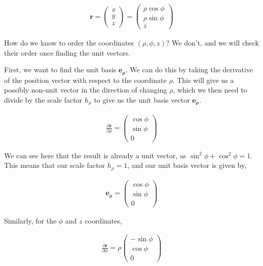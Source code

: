\documentclass[11pt]{amsart}
\begin{document}
\begin{align*}
  \mathbf{r} =
  \begin{pmatrix}
    x \\
    y \\
    z
  \end{pmatrix} =
  \begin{pmatrix}
    \rho\cos\phi \\
    \rho\sin\phi \\
    z
  \end{pmatrix}
\end{align*}

How do we know to order the coordinates $(\rho, \phi, z)$? We don't, and we will check their order once finding the unit vectors.

First, we want to find the unit basis $\mathbf{e_{\rho}}$. We can do this by taking the derivative of the position vector with respect to the coordinate $\rho$. This will give us a possibly non-unit vector in the direction of changing $\rho$, which we then need to divide by the scale factor $h_{\rho}$ to give us the unit basis vector $\mathbf{e_{\rho}}$.

\begin{align*}
  \frac{\partial\mathbf{r}}{\partial\rho} =
  \begin{pmatrix}
    \cos\phi \\
    \sin\phi \\
    0
  \end{pmatrix}
\end{align*}

We can see here that the result is already a unit vector, as $\sin^2\phi + \cos^2\phi = 1$. This means that our scale factor $h_{\rho} = 1$, and our unit basis vector is given by,

\begin{align*}
  \mathbf{e_{\rho}} =
  \begin{pmatrix}
    \cos\phi \\
    \sin\phi \\
    0
  \end{pmatrix}
\end{align*}

Similarly, for the $\phi$ and $z$ coordinates,

\begin{align*}
  \frac{\partial\mathbf{r}}{\partial\phi} = \rho
  \begin{pmatrix}
    -\sin\phi \\
    \cos\phi \\
    0
  \end{pmatrix}
\end{align*}
\end{document}
